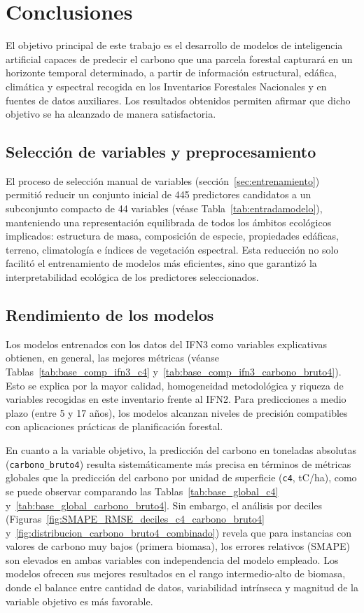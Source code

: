 \section{Conclusiones}
\label{sec:conclusiones}

El objetivo principal de este trabajo es el desarrollo de modelos de inteligencia artificial capaces de predecir el carbono que una parcela forestal capturará en un horizonte temporal determinado, a partir de información estructural, edáfica, climática y espectral recogida en los Inventarios Forestales Nacionales y en fuentes de datos auxiliares. Los resultados obtenidos permiten afirmar que dicho objetivo se ha alcanzado de manera satisfactoria.

\subsection*{Selección de variables y preprocesamiento}

El proceso de selección manual de variables (sección~\ref{sec:entrenamiento}) permitió reducir un conjunto inicial de 445 predictores candidatos a un subconjunto compacto de 44 variables (véase Tabla~\ref{tab:entradamodelo}), manteniendo una representación equilibrada de todos los ámbitos ecológicos implicados: estructura de masa, composición de especie, propiedades edáficas, terreno, climatología e índices de vegetación espectral. Esta reducción no solo facilitó el entrenamiento de modelos más eficientes, sino que garantizó la interpretabilidad ecológica de los predictores seleccionados.

\subsection*{Rendimiento de los modelos}

Los modelos entrenados con los datos del IFN3 como variables explicativas obtienen, en general, las mejores métricas (véanse Tablas~\ref{tab:base_comp_ifn3_c4} y~\ref{tab:base_comp_ifn3_carbono_bruto4}). Esto se explica por la mayor calidad, homogeneidad metodológica y riqueza de variables recogidas en este inventario frente al IFN2. Para predicciones a medio plazo (entre 5 y 17 años), los modelos alcanzan niveles de precisión compatibles con aplicaciones prácticas de planificación forestal.

En cuanto a la variable objetivo, la predicción del carbono en toneladas absolutas (\texttt{carbono\_bruto4}) resulta sistemáticamente más precisa en términos de métricas globales que la predicción del carbono por unidad de superficie (\texttt{c4}, tC/ha), como se puede observar comparando las Tablas~\ref{tab:base_global_c4} y~\ref{tab:base_global_carbono_bruto4}. Sin embargo, el análisis por deciles (Figuras~\ref{fig:SMAPE_RMSE_deciles_c4_carbono_bruto4} y~\ref{fig:distribucion_carbono_bruto4_combinado}) revela que para instancias con valores de carbono muy bajos (primera biomasa), los errores relativos (SMAPE) son elevados en ambas variables con independencia del modelo empleado. Los modelos ofrecen sus mejores resultados en el rango intermedio-alto de biomasa, donde el balance entre cantidad de datos, variabilidad intrínseca y magnitud de la variable objetivo es más favorable.

